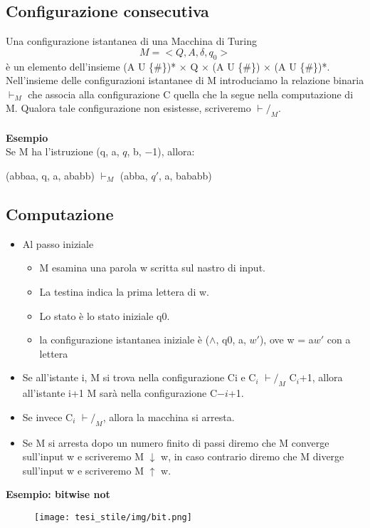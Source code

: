 \subsection{Configurazione consecutiva}
Una configurazione istantanea di una Macchina di Turing $$M=<Q,A,\delta,q_0>$$ è un elemento dell’insieme (A U \{\#\})* × Q × (A U \{\#\}) × (A U \{\#\})*.\\
Nell’insieme delle configurazioni istantanee di M introduciamo la relazione binaria  $\vdash_M$  che associa alla configurazione C quella che la segue nella computazione di M. Qualora tale configurazione non esistesse, scriveremo $\vdash/_M$.\\\\
\textbf{Esempio}\\
Se M ha l’istruzione (q, a, $q$, b, $-$1), allora:
\begin{center}
    (abbaa, q, a, ababb) $\vdash_M$ (abba, $q'$, a, bababb)
\end{center}
\subsection{Computazione}
\begin{itemize}
    \item Al passo iniziale 
    
    \begin{itemize}
    \item M esamina una parola w scritta sul nastro di input.
    
    \item La testina indica la prima lettera di w.
    
    \item Lo stato è lo stato iniziale q0.
    
    \item la configurazione istantanea iniziale è ($\wedge$, q0, a, $w'$), ove w = a$w'$ con a lettera
    \end{itemize}
\end{itemize}
\begin{itemize}
    \item Se all’istante i, M si trova nella configurazione Ci e C$_i$  $\vdash/_M$ C$_i$+1, allora all’istante i+1 M sarà nella configurazione C$-i$+1.
    
    \item Se invece C$_i$ $\vdash/_M$, allora la macchina si arresta.
    
    \item Se M si arresta dopo un numero finito di passi diremo che M converge sull’input w e scriveremo M $\downarrow$ w, in caso contrario diremo che M diverge sull’input w e scriveremo M $\uparrow$ w.
\end{itemize}
\newpage
\textbf{Esempio: bitwise not}
\begin{figure}[htp]
    \centering
     \texttt{[image: tesi\_stile/img/bit.png]}
\end{figure}


